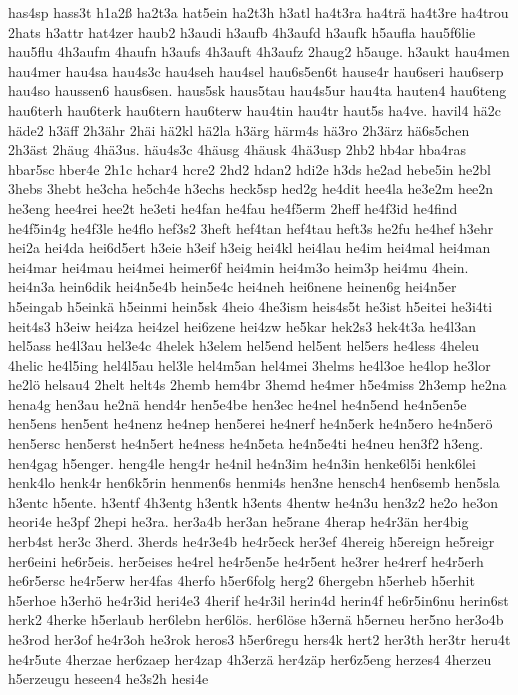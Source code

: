 {has4sp
hass3t
h1a2ß
ha2t3a
hat5ein
ha2t3h
h3atl
ha4t3ra
ha4trä
ha4t3re
ha4trou
2hats
h3attr
hat4zer
haub2
h3audi
h3aufb
4h3aufd
h3aufk
h5aufla
hau5f6lie
hau5flu
4h3aufm
4haufn
h3aufs
4h3auft
4h3aufz
2haug2
h5auge.
h3aukt
hau4men
hau4mer
hau4sa
hau4s3c
hau4seh
hau4sel
hau6s5en6t
hause4r
hau6seri
hau6serp
hau4so
haussen6
haus6sen.
haus5sk
haus5tau
hau4s5ur
hau4ta
hauten4
hau6teng
hau6terh
hau6terk
hau6tern
hau6terw
hau4tin
hau4tr
haut5s
ha4ve.
havil4
hä2c
häde2
h3äff
2h3ähr
2häi
hä2kl
hä2la
h3ärg
härm4s
hä3ro
2h3ärz
hä6s5chen
2h3äst
2häug
4hä3us.
häu4s3c
4häusg
4häusk
4hä3usp
2hb2
hb4ar
hba4ras
hbar5sc
hber4e
2h1c
hchar4
hcre2
2hd2
hdan2
hdi2e
h3ds
he2ad
hebe5in
he2bl
3hebs
3hebt
he3cha
he5ch4e
h3echs
heck5sp
hed2g
he4dit
hee4la
he3e2m
hee2n
he3eng
hee4rei
hee2t
he3eti
he4fan
he4fau
he4f5erm
2heff
he4f3id
he4find
he4f5in4g
he4f3le
he4flo
hef3s2
3heft
hef4tan
hef4tau
heft3s
he2fu
he4hef
h3ehr
hei2a
hei4da
hei6d5ert
h3eie
h3eif
h3eig
hei4kl
hei4lau
he4im
hei4mal
hei4man
hei4mar
hei4mau
hei4mei
heimer6f
hei4min
hei4m3o
heim3p
hei4mu
4hein.
hei4n3a
hein6dik
hei4n5e4b
hein5e4c
hei4neh
hei6nene
heinen6g
hei4n5er
h5eingab
h5einkä
h5einmi
hein5sk
4heio
4he3ism
heis4s5t
he3ist
h5eitei
he3i4ti
heit4s3
h3eiw
hei4za
hei4zel
hei6zene
hei4zw
he5kar
hek2s3
hek4t3a
he4l3an
hel5ass
he4l3au
hel3e4c
4helek
h3elem
hel5end
hel5ent
hel5ers
he4less
4heleu
4helic
he4l5ing
hel4l5au
hel3le
hel4m5an
hel4mei
3helms
he4l3oe
he4lop
he3lor
he2lö
helsau4
2helt
helt4s
2hemb
hem4br
3hemd
he4mer
h5e4miss
2h3emp
he2na
hena4g
hen3au
he2nä
hend4r
hen5e4be
hen3ec
he4nel
he4n5end
he4n5en5e
hen5ens
hen5ent
he4nenz
he4nep
hen5erei
he4nerf
he4n5erk
he4n5ero
he4n5erö
hen5ersc
hen5erst
he4n5ert
he4ness
he4n5eta
he4n5e4ti
he4neu
hen3f2
h3eng.
hen4gag
h5enger.
heng4le
heng4r
he4nil
he4n3im
he4n3in
henke6l5i
henk6lei
henk4lo
henk4r
hen6k5rin
henmen6s
henmi4s
hen3ne
hensch4
hen6semb
hen5sla
h3entc
h5ente.
h3entf
4h3entg
h3entk
h3ents
4hentw
he4n3u
hen3z2
he2o
he3on
heori4e
he3pf
2hepi
he3ra.
her3a4b
her3an
he5rane
4herap
he4r3än
her4big
herb4st
her3c
3herd.
3herds
he4r3e4b
he4r5eck
her3ef
4hereig
h5ereign
he5reigr
her6eini
he6r5eis.
her5eises
he4rel
he4r5en5e
he4r5ent
he3rer
he4rerf
he4r5erh
he6r5ersc
he4r5erw
her4fas
4herfo
h5er6folg
herg2
6hergebn
h5erheb
h5erhit
h5erhoe
h3erhö
he4r3id
heri4e3
4herif
he4r3il
herin4d
herin4f
he6r5in6nu
herin6st
herk2
4herke
h5erlaub
her6lebn
her6lös.
her6löse
h3ernä
h5erneu
her5no
her3o4b
he3rod
her3of
he4r3oh
he3rok
heros3
h5er6regu
hers4k
hert2
her3th
her3tr
heru4t
he4r5ute
4herzae
her6zaep
her4zap
4h3erzä
her4zäp
her6z5eng
herzes4
4herzeu
h5erzeugu
heseen4
he3s2h
hesi4e
}

